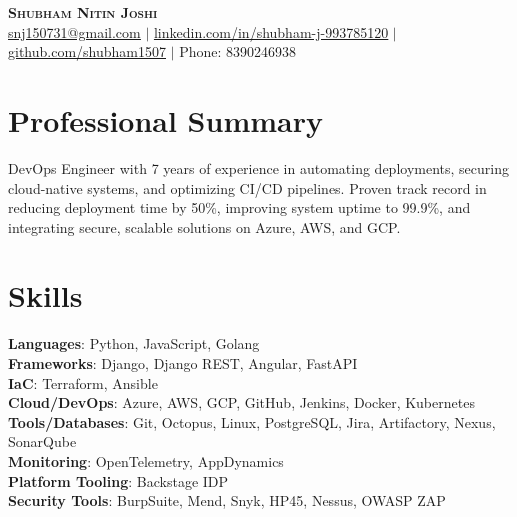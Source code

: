 \documentclass[letterpaper, 11pt]{article}
\begin{document}
\begin{center}
    \textbf{\Huge \scshape Shubham Nitin Joshi} \\
    \href{mailto:shubham.joshi1507@gmail.com}{\underline{snj150731@gmail.com}} $|$
    \href{https://www.linkedin.com/in/shubham-j-993785120/}{\underline{linkedin.com/in/shubham-j-993785120}} $|$
    \href{https://github.com/shubham1507}{\underline{github.com/shubham1507}} $|$
    Phone: 8390246938
\end{center}

\vspace{-15pt}

\section{Professional Summary}
\small{
DevOps Engineer with 7 years of experience in automating deployments, securing cloud-native systems, and optimizing CI/CD pipelines. Proven track record in reducing deployment time by 50\%, improving system uptime to 99.9\%, and integrating secure, scalable solutions on Azure, AWS, and GCP.
}

\vspace{-15pt}

\section{Skills}
\begin{itemize}[leftmargin=0.25in, label={}]
\small{
\item \textbf{Languages}{: Python, JavaScript, Golang} \\
\textbf{Frameworks}{: Django, Django REST, Angular, FastAPI} \\
\textbf{IaC}{: Terraform, Ansible} \\
\textbf{Cloud/DevOps}{: Azure, AWS, GCP, GitHub, Jenkins, Docker, Kubernetes} \\
\textbf{Tools/Databases}{: Git, Octopus, Linux, PostgreSQL, Jira, Artifactory, Nexus, SonarQube} \\
\textbf{Monitoring}{: OpenTelemetry, AppDynamics} \\
\textbf{Platform Tooling}{: Backstage IDP} \\
\textbf{Security Tools}{: BurpSuite, Mend, Snyk, HP45, Nessus, OWASP ZAP}
}
\end{itemize}

\vspace{-15pt}
\end{document}
